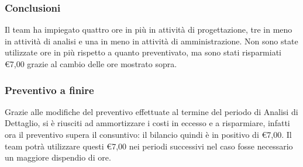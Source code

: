 \subsubsection{Conclusioni}
Il team ha impiegato quattro ore in più in attività di progettazione, tre in meno in attività di analisi e una in meno in attività di amministrazione. Non sono state utilizzate ore in più rispetto a quanto preventivato, ma sono stati risparmiati \euro7,00 grazie al cambio delle ore mostrato sopra.

\subsubsection{Preventivo a finire}
Grazie alle modifiche del preventivo effettuate al termine del periodo di Analisi di Dettaglio, si è riusciti ad ammortizzare i costi in eccesso e a risparmiare, infatti ora il preventivo supera il consuntivo: il bilancio quindi è in positivo di \euro7,00.
Il team potrà utilizzare questi \euro7,00 nei periodi successivi nel caso fosse necessario un maggiore dispendio di ore.